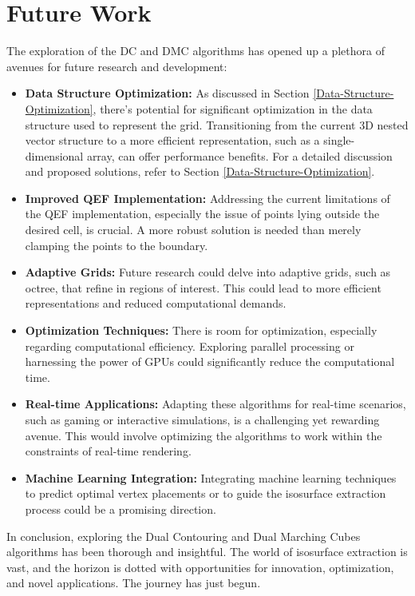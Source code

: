 \section{Future Work}

The exploration of the DC and DMC algorithms has opened up a plethora of avenues for future research and development:

\begin{itemize}
    \item \textbf{Data Structure Optimization:} As discussed in Section \ref{Data-Structure-Optimization}, there's potential for significant optimization in the data structure used to represent the grid. Transitioning from the current 3D nested vector structure to a more efficient representation, such as a single-dimensional array, can offer performance benefits. For a detailed discussion and proposed solutions, refer to Section \ref{Data-Structure-Optimization}.

    \item \textbf{Improved QEF Implementation:} Addressing the current limitations of the QEF implementation, especially the issue of points lying outside the desired cell, is crucial. A more robust solution is needed than merely clamping the points to the boundary.

    \item \textbf{Adaptive Grids:} Future research could delve into adaptive grids, such as octree, that refine in regions of interest. This could lead to more efficient representations and reduced computational demands.
    
    \item \textbf{Optimization Techniques:} There is room for optimization, especially regarding computational efficiency. Exploring parallel processing or harnessing the power of GPUs could significantly reduce the computational time.

    \item \textbf{Real-time Applications:} Adapting these algorithms for real-time scenarios, such as gaming or interactive simulations, is a challenging yet rewarding avenue. This would involve optimizing the algorithms to work within the constraints of real-time rendering.
    
    \item \textbf{Machine Learning Integration:} Integrating machine learning techniques to predict optimal vertex placements or to guide the isosurface extraction process could be a promising direction.
\end{itemize}

\noindent In conclusion, exploring the Dual Contouring and Dual Marching Cubes algorithms has been thorough and insightful. The world of isosurface extraction is vast, and the horizon is dotted with opportunities for innovation, optimization, and novel applications. The journey has just begun.
